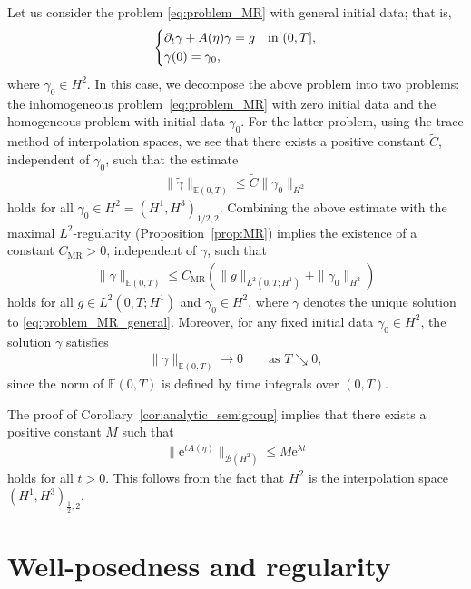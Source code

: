 \documentclass{article}
\theoremstyle{remark}
\theoremstyle{definition}
\numberwithin{equation}{section}
\begin{document}
Let us consider the problem \eqref{eq:problem_MR} with general initial data;
that is,
\begin{align}
    \begin{dcases*}
        \partial_t \gamma + A(\eta)\gamma = g&in $(0,T]$,\\
        \gamma(0) = \gamma_0,
    \end{dcases*}
    \label{eq:problem_MR_general}
\end{align}
where $\gamma_0 \in H^2$. In this case, we decompose the above problem into two problems: the inhomogeneous problem~\eqref{eq:problem_MR} with zero initial data and the homogeneous problem with initial data $\gamma_0$.
For the latter problem, using the trace method of interpolation spaces, we see that there exists a positive constant $\tilde{C}$, independent of $\gamma_0$, such that the estimate
\begin{align*}
    \|\tilde{\gamma}\|_{\mathbb{E}(0,T)} \le \tilde{C}\|\gamma_0\|_{H^2}
\end{align*}
holds for all $\gamma_0 \in H^2 = (H^1, H^3)_{1/2,2}$. Combining the above estimate with the maximal $L^2$-regularity (Proposition~\ref{prop:MR}) implies the existence of a constant $C_{\mathrm{MR}}>0$, independent of $\gamma$, such that
\begin{align}
    \|\gamma\|_{\mathbb{E}(0,T)}\le C_{\mathrm{MR}}(\|g\|_{L^2(0,T;H^1)}+\|\gamma_0\|_{H^2})
    \label{eq:MR_ineq}
\end{align}
holds for all $g\in L^2(0,T;H^1)$ and $\gamma_0\in H^2$, where $\gamma$ denotes the unique solution to \eqref{eq:problem_MR_general}.
Moreover, for any fixed initial data $\gamma_0 \in H^2$, the solution $\gamma$ satisfies
\begin{align}
    \|\gamma\|_{\mathbb{E}(0,T)}\to0\qquad\text{as }T\searrow0,
    \label{eq:MR_ineq_limit}
\end{align}
since the norm of $\mathbb{E}(0,T)$ is defined by time integrals over $(0,T)$.

The proof of Corollary~\ref{cor:analytic_semigroup} implies that there exists a positive constant $M$ such that
\begin{align}
    \|\mathrm{e}^{tA(\eta)}\|_{\mathcal{B}(H^2)}\le M\mathrm{e}^{\lambda t}
    \label{eq:semigroup_estimate_2}
\end{align}
holds for all $t>0$.
This follows from the fact that $H^2$ is the interpolation space $(H^1,H^3)_{\frac{1}{2},2}$.



\section{Well-posedness and regularity}
\label{sec:well-posedness}
\end{document}
